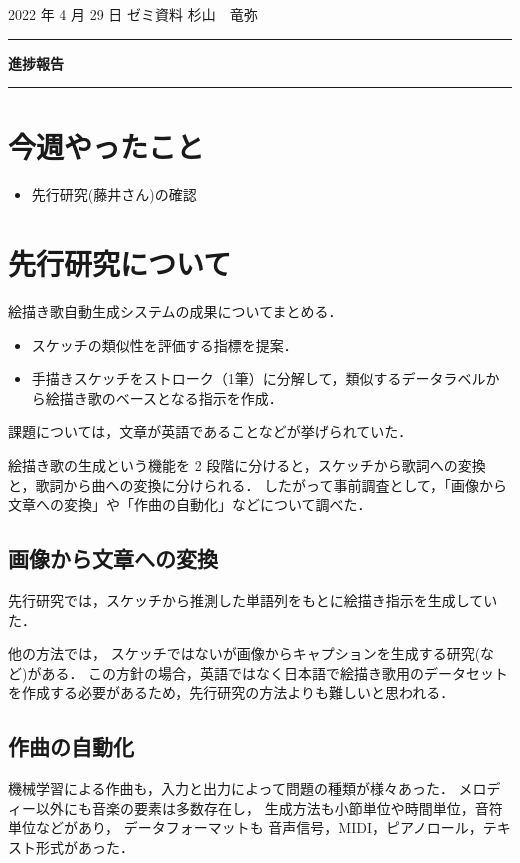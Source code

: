 \documentclass[onecolumn]{ujarticle}   %
\begin{document}

		\noindent
		\hspace{1em}
		2022 年 4 月 29 日
		ゼミ資料
		\hfill
		杉山　竜弥
		\vspace{2mm}

		\hrule
		\begin{center}
			{\Large \bf 進捗報告}
		\end{center}
		\hrule
		\vspace{9mm}


\section{今週やったこと}
\begin{itemize}
  \item 先行研究(藤井さん)の確認
\end{itemize}

\section{先行研究について}
絵描き歌自動生成システムの成果についてまとめる．
\begin{itemize}
  \item スケッチの類似性を評価する指標を提案．
  \item 手描きスケッチをストローク（1筆）に分解して，類似するデータラベルから絵描き歌のベースとなる指示を作成．
\end{itemize}
課題については，文章が英語であることなどが挙げられていた．

絵描き歌の生成という機能を 2 段階に分けると，スケッチから歌詞への変換と，歌詞から曲への変換に分けられる．
したがって事前調査として，「画像から文章への変換」や「作曲の自動化」などについて調べた．

\subsection{画像から文章への変換}
先行研究では，スケッチから推測した単語列をもとに絵描き指示を生成していた．

他の方法では，
スケッチではないが画像からキャプションを生成する研究(\cite{vinyals2015show}など)がある．
この方針の場合，英語ではなく日本語で絵描き歌用のデータセットを作成する必要があるため，先行研究の方法よりも難しいと思われる．

\subsection{作曲の自動化}
機械学習による作曲も，入力と出力によって問題の種類が様々あった．
メロディー以外にも音楽の要素は多数存在し，
生成方法も小節単位や時間単位，音符単位などがあり，
データフォーマットも 音声信号，MIDI，ピアノロール，テキスト形式があった．
\end{document}

